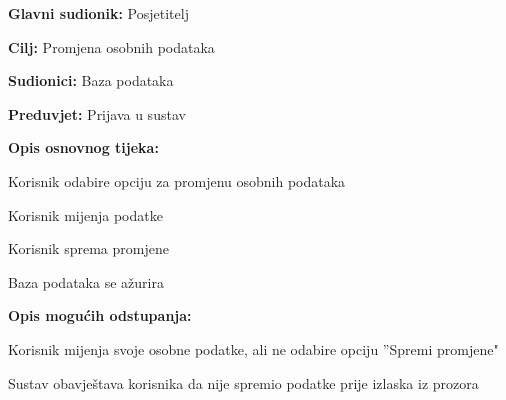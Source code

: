 					\noindent {}
					\begin{packed_item}
						
						\item \textbf{Glavni sudionik: } Posjetitelj
						\item  \textbf{Cilj:}  Promjena osobnih podataka
						\item  \textbf{Sudionici:}  Baza podataka
						\item  \textbf{Preduvjet:}  Prijava u sustav
						\item  \textbf{Opis osnovnog tijeka:}
						
						\item[] \begin{packed_enum}
							
							\item  Korisnik odabire opciju za promjenu osobnih podataka
							\item  Korisnik mijenja podatke
							\item  Korisnik sprema promjene
							\item  Baza podataka se ažurira						
						\end{packed_enum}
						
						\item  \textbf{Opis mogućih odstupanja:}
						
						\item[] \begin{packed_item}
							
							\item[2.a]  Korisnik mijenja svoje osobne podatke, ali ne odabire opciju ”Spremi promjene"
							\item[] \begin{packed_enum}
								
								\item  Sustav obavještava korisnika da nije spremio podatke prije izlaska iz prozora							
								
							\end{packed_enum}						
							
						\end{packed_item}
					\end{packed_item}
				
